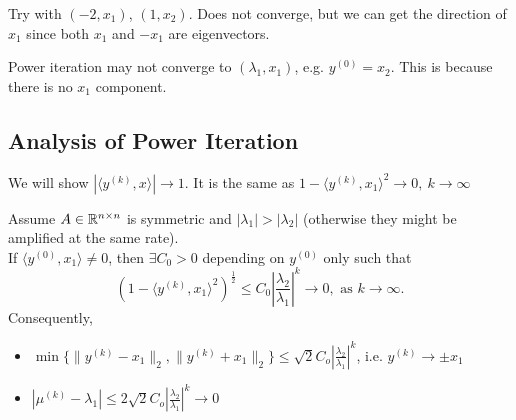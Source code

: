 \documentclass[../main/main.tex]{subfiles}
\begin{document}
\begin{remark}
	Try with $\left( -2,x_1 \right) $, $(1,x_2)$. Does not converge, but we can get the direction of $x_1$ since both $x_1$ and $-x_1$ are eigenvectors.\\

\end{remark}
\begin{remark}
Power iteration may not converge to $\left( \lambda_1,x_1 \right) $, e.g. $y^{(0)}=x_2$. This is because there is no $x_1$ component.
	
\end{remark}
\subsection{Analysis of Power Iteration}
We will show $|\langle y^{(k)},x\rangle|\to 1$. It is the same as $1-\langle y^{(k)},x_1\rangle^{2}\to 0,\ k\to \infty$
\begin{theorem}
	Assume $A\in \mathbb{R}^{n\times n}$ is symmetric and $|\lambda_1|>|\lambda_2|$ (otherwise they might be amplified at the same rate).\\

	If $\langle y^{(0)}, x_1\rangle \neq 0$, then $\exists  C_0>0$ depending on $y^{(0)}$ only such that  \[
		\left( 1-\langle y^{(k)},x_1\rangle^2 \right) ^{\frac{1}{2}}\le C_0 \left| \frac{\lambda_2}{\lambda_1} \right|^{k}\to 0, \text{ as } k\to \infty 
	.\] Consequently, 
	\begin{itemize}
	\item $\min \{\|y^{(k)}-x_1\|_2,\|y^{(k)}+x_1\|_2\}\le \sqrt{2}C_o \left| \frac{\lambda_2}{\lambda_1} \right| ^{k}$, i.e. $y^{(k)}\to \pm x_1$
		\item $|\mu^{(k)}-\lambda_1|\le 2\sqrt{2} C_o\left| \frac{\lambda_2}{\lambda_1} \right| ^{k}\to 0$
	\end{itemize}
\end{theorem}
\end{document}
